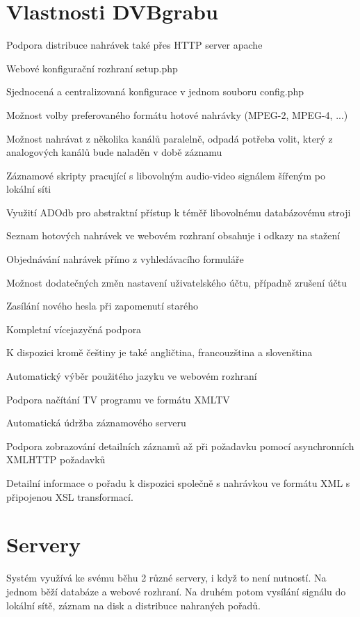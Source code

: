 \section{Vlastnosti DVBgrabu}
\bitem
\item Podpora distribuce nahrávek také přes HTTP server apache
\item Webové konfigurační rozhraní setup.php
\item Sjednocená a centralizovaná konfigurace v jednom souboru config.php
\item Možnost volby preferovaného formátu hotové nahrávky (MPEG-2, MPEG-4, ...)
\item Možnost nahrávat z několika kanálů paralelně, odpadá potřeba volit, který z analogových kanálů bude naladěn v době záznamu
\item Záznamové skripty pracující s libovolným audio-video signálem šířeným po lokální síti
\item Využití ADOdb pro abstraktní přístup k téměř libovolnému databázovému stroji
\item Seznam hotových nahrávek ve webovém rozhraní obsahuje i odkazy na stažení
\item Objednávání nahrávek přímo z vyhledávacího formuláře
\item Možnost dodatečných změn nastavení uživatelského účtu, případně zrušení účtu
\item Zasílání nového hesla při zapomenutí starého
\item Kompletní vícejazyčná podpora
\item K dispozici kromě češtiny je také angličtina, francouzština a slovenština
\item Automatický výběr použitého jazyku ve webovém rozhraní
\item Podpora načítání TV programu ve formátu XMLTV
\item Automatická údržba záznamového serveru
\item Podpora zobrazování detailních záznamů až při požadavku pomocí asynchronních XMLHTTP požadavků
\item Detailní informace o pořadu k dispozici společně s nahrávkou ve formátu XML s připojenou XSL transformací.
\eitem

\section{Servery}
Systém využívá ke svému běhu 2 různé servery, i když to není nutností. Na jednom běží databáze a webové rozhraní. Na druhém potom vysílání signálu do lokální sítě, záznam na disk a distribuce nahraných pořadů.
